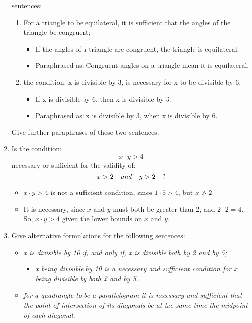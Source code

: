 \begin{enumerate}
  sentences:
  \begin{enumerate}
  \item For a triangle to be equilateral, it is sufficient that the
    angles of the triangle be congruent;
    \begin{itemize}
    \item If the angles of a triangle are congruent, the triangle is
      equilateral.
    \item Paraphrased as: Congruent angles on a triangle mean it is
      equilateral.
    \end{itemize}
  \item the condition: x is divisible by 3, is necessary for x to be
    divisible by 6.
    \begin{itemize}
    \item If x is divisible by 6, then x is divisible by 3.
    \item Paraphrased as: x is divisible by 3, when x is divisible by 6.
    \end{itemize}
  \end{enumerate}
  Give further paraphrases of these two sentences.
\item Is the condition: $$x{\cdot}y > 4$$ necessary or sufficient for
  the validity of: $$x > 2 \quad \text{\emph{and}} \quad y > 2 \quad
  \text{?}$$
  \begin{itemize}
  \item $x{\cdot}y > 4$ is not a sufficient condition, since $1{\cdot}5 >
    4$, but $x \ngtr 2$.
  \item It is necessary, since $x$ and $y$ must both be greater than 2,
    and $2{\cdot}2=4$.  So, $x{\cdot}y > 4$ given the lower bounds on
    $x$ and $y$.
  \end{itemize}
\item Give alternative formulations for the following sentences:
  \begin{itemize}
  \item \emph{x is divisible by 10 if, and only if, x is divisible
      both by 2 and by 5;}
    \begin{itemize}
    \item \emph{x being divisible by 10 is a necessary and sufficient
        condition for x being divisible by both 2 and by 5.}
    \end{itemize}
  \item \emph{for a quadrangle to be a parallelogram it is necessary
      and sufficient that the point of intersection of its diagonals
      be at the same time the midpoint of each diagonal.}

\end{itemize}
\end{enumerate}
